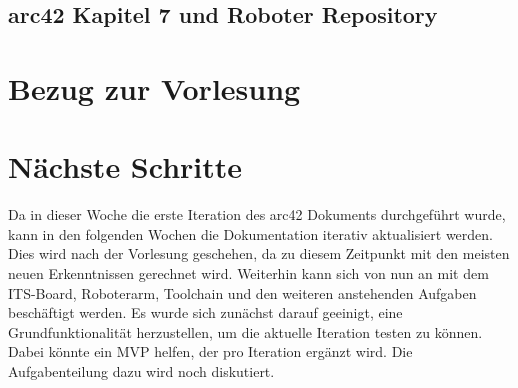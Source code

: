 \documentclass{article}
\begin{document}
\subsection{arc42 Kapitel 7 und Roboter Repository}



\section{Bezug zur Vorlesung}

 

\section{Nächste Schritte}
Da in dieser Woche die erste Iteration des arc42 Dokuments durchgeführt wurde, kann in den folgenden Wochen die Dokumentation iterativ aktualisiert werden. Dies wird nach der Vorlesung geschehen, da zu diesem Zeitpunkt mit den meisten neuen Erkenntnissen gerechnet wird. Weiterhin kann sich von nun an mit dem ITS-Board, Roboterarm, Toolchain und den weiteren anstehenden Aufgaben beschäftigt werden. Es wurde sich zunächst darauf geeinigt, eine Grundfunktionalität herzustellen, um die aktuelle Iteration testen zu können. Dabei könnte ein MVP helfen, der pro Iteration ergänzt wird. Die Aufgabenteilung dazu wird noch diskutiert.
\end{document}
